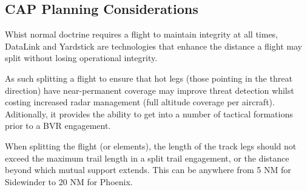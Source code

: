 \subsection{CAP Planning Considerations}

Whist normal doctrine requires a flight to maintain integrity at all times,
DataLink and Yardstick are technologies that enhance the distance a flight
may split without losing operational integrity.

As such splitting a flight to ensure that hot legs (those pointing in the
threat direction) have near-permanent coverage may improve threat detection
whilst costing increased radar management (full altitude coverage per
aircraft). Aditionally, it provides the ability to get into a number of
tactical formations prior to a BVR engagement.

When splitting the flight (or elements), the length of the track legs
should not exceed the maximum trail length in a split trail engagement, or the
distance beyond which mutual support extends. This can be anywhere from 5 NM
for Sidewinder to 20 NM for Phoenix.